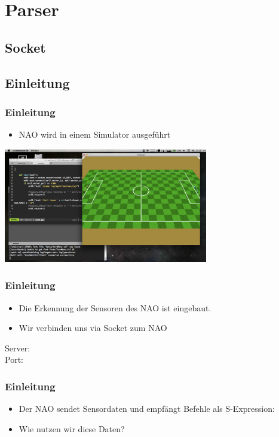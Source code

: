 \section{Parser}

\subsection{Socket}
\subsection{Einleitung}

\frame
{
  \frametitle{Einleitung}
  \begin{itemize}
    \item NAO wird in einem Simulator ausgef\"uhrt
  \end{itemize}
  \begin{center}\includegraphics[height=5cm, center]{simulator.pdf}\end{center}
}
  
\frame
{
  \frametitle{Einleitung}
  \begin{itemize}
    \item Die Erkennung der Sensoren des NAO ist eingebaut.
    \item Wir verbinden uns via Socket zum NAO
  \end{itemize}
  
  \begin{center}\tiny{Server: \\ Port: }\end{center}
}

\frame
{
  \frametitle{Einleitung}
  \begin{itemize}
    \item Der NAO sendet Sensordaten und empf\"angt Befehle als S-Expression:\\\vskip0.5cm
  \tiny{}\end{itemize}\begin{itemize}
    \item Wie nutzen wir diese Daten?
  \end{itemize}
}


